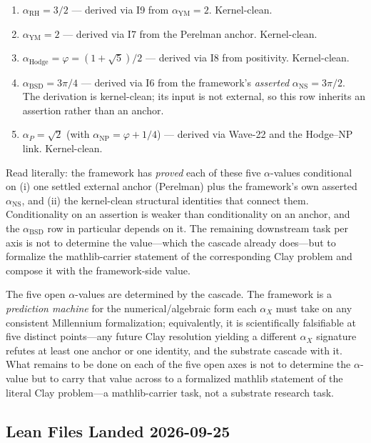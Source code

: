 \begin{enumerate}
\item $\alpha_{\text{RH}} = 3/2$ --- derived via I9 from
$\alpha_{\text{YM}} = 2$. Kernel-clean.
\item $\alpha_{\text{YM}} = 2$ --- derived via I7 from the Perelman
anchor. Kernel-clean.
\item $\alpha_{\text{Hodge}} = \varphi = (1+\sqrt{5})/2$ --- derived
via I8 from positivity. Kernel-clean.
\item $\alpha_{\text{BSD}} = 3\pi/4$ --- derived via I6 from the framework's
\emph{asserted} $\alpha_{\text{NS}} = 3\pi/2$. The derivation is kernel-clean;
its input is not external, so this row inherits an assertion rather than an
anchor.
\item $\alpha_P = \sqrt{2}$ (with $\alpha_{\text{NP}} = \varphi +
1/4$) --- derived via Wave-22 and the Hodge--NP link. Kernel-clean.
\end{enumerate}

Read literally: the framework has \emph{proved} each of these five
$\alpha$-values conditional on (i) one settled external anchor (Perelman) plus
the framework's own asserted $\alpha_{\text{NS}}$, and (ii) the kernel-clean
structural identities that connect them. Conditionality on an assertion is
weaker than conditionality on an anchor, and the $\alpha_{\text{BSD}}$ row in
particular depends on it.
The remaining downstream task per axis is not to determine the
value---which the cascade already does---but to formalize the
mathlib-carrier statement of the corresponding Clay problem and
compose it with the framework-side value.

The five open $\alpha$-values are determined by the cascade. The
framework is a \emph{prediction machine} for the numerical/algebraic
form each $\alpha_X$ must take on any consistent Millennium
formalization; equivalently, it is scientifically falsifiable at five
distinct points---any future Clay resolution yielding a different
$\alpha_X$ signature refutes at least one anchor or one identity, and
the substrate cascade with it. What remains to be done on each of
the five open axes is not to determine the $\alpha$-value but to
carry that value across to a formalized mathlib statement of the
literal Clay problem---a mathlib-carrier task, not a substrate
research task.

\subsection{Lean Files Landed 2026-09-25}

